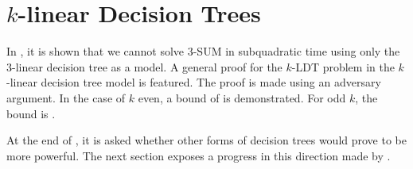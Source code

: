 \section{$k$-linear Decision Trees}

In \cite{erickson:1999}, it is shown that we cannot solve $3$-SUM in
subquadratic time using only the $3$-linear decision tree as a model. A
general proof for the $k$-LDT problem in the $k$-linear decision tree model
is featured. The proof is made using an adversary argument. In the case of $k$
even, a bound of  is demonstrated. For odd $k$, the
bound is .

At the end of \cite{erickson:1999}, it is asked whether other forms of
decision trees would prove to be more powerful. The next section exposes a
progress in this direction made by \cite{ailon:2005}.

